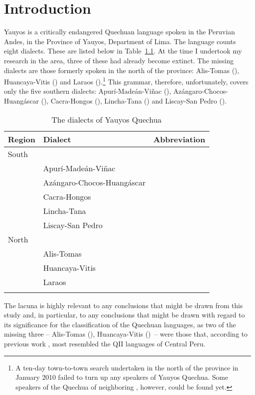 \chapter{Introduction}\label{ch:introduction}

Yauyos is a critically endangered Quechuan language spoken in the Peruvian Andes, in the Province of Yauyos, Department of Lima. The language counts eight dialects. These are listed below in Table~\ref{tab:1:dialects}. At the time I undertook my research in the area, three of these had already become extinct. The missing dialects are those formerly spoken in the north of the province: Alis-Tomas (\AT{}), Huancaya-Vitis (\HVit{}) and Laraos (\Lar{}).\footnote{A ten-day town-to-town search undertaken in the north of the province in January 2010 failed to turn up any speakers of Yauyos Quechua. Some speakers of the Quechua of neighboring , however, could be found yet.} This grammar, therefore, unfortunately, covers only the five southern dialects: Apurí-Madeán-Viñac (\AMV{}), Azángaro-Chocos-Huangáscar (\ACH{}), Cacra-Hongos (\CH{}), Lincha-Tana (\LT{}) and Liscay-San Pedro (\SP{}). 

\begin{table} 
\caption{The dialects of Yauyos Quechua}
\label{tab:1:dialects}
\begin{tabular}{lll}
\lsptoprule
Region &Dialect		&Abbreviation	\\
\midrule
South &&\\
&Apurí-Madeán-Viñac &\AMV{}\\
&Azángaro-Chocos-Huangáscar &\ACH{}\\
&Cacra-Hongos &\CH{}\\
&Lincha-Tana &\LT{}\\
&Liscay-San Pedro &\SP{}\\
North &&\\
&Alis-Tomas &\AT{}\\ 
&Huancaya-Vitis &\HVit{}\\ 
&Laraos &\Lar{}\\
\lspbottomrule
\end{tabular} 
\end{table}

\noindent
The lacuna is highly relevant to any conclusions that might be drawn from this study and, in particular, to any conclusions that might be drawn with regard to its significance for the classification of the Quechuan languages, as two of the missing three -- Alis-Tomas (\AT{}), Huancaya-Vitis (\HVit{})~-- were those that, according to previous work \citep{Taylor94a,Taylor00}, most resembled the QII languages of Central Peru.

